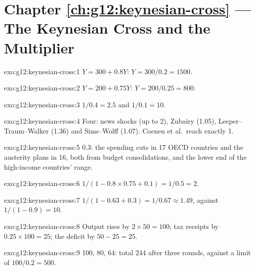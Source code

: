 \section*{Chapter \ref{ch:g12:keynesian-cross} --- The Keynesian Cross and the Multiplier}

\begin{solution}{exo:g12:keynesian-cross:1}
$Y = 300 + 0.8Y$: $Y = 300/0.2 = 1500$.
\end{solution}

\begin{solution}{exo:g12:keynesian-cross:2}
$Y = 200 + 0.75Y$: $Y = 200/0.25 = 800$.
\end{solution}

\begin{solution}{exo:g12:keynesian-cross:3}
$1/0.4 = 2.5$ and $1/0.1 = 10$.
\end{solution}

\begin{solution}{exo:g12:keynesian-cross:4}
Four: news shocks (up to 2), Zubairy (1.05), Leeper--Traum--Walker (1.36) and Sims--Wolff (1.07). Coenen et al.\ reach exactly 1.
\end{solution}

\begin{solution}{exo:g12:keynesian-cross:5}
0.3: the spending cuts in 17 OECD countries and the austerity plans in 16, both from budget consolidations, and the lower end of the high-income countries' range.
\end{solution}

\begin{solution}{exo:g12:keynesian-cross:6}
$1/(1 - 0.8 \times 0.75 + 0.1) = 1/0.5 = 2$.
\end{solution}

\begin{solution}{exo:g12:keynesian-cross:7}
$1/(1 - 0.63 + 0.3) = 1/0.67 \approx 1.49$, against $1/(1 - 0.9) = 10$.
\end{solution}

\begin{solution}{exo:g12:keynesian-cross:8}
Output rises by $2 \times 50 = 100$; tax receipts by $0.25 \times 100 = 25$; the deficit by $50 - 25 = 25$.
\end{solution}

\begin{solution}{exo:g12:keynesian-cross:9}
100, 80, 64: total 244 after three rounds, against a limit of $100/0.2 = 500$.
\end{solution}

